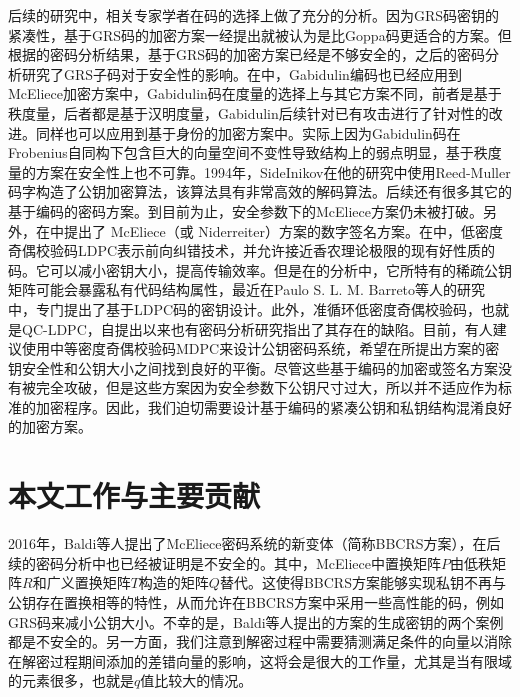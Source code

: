 后续的研究中，相关专家学者在码的选择上做了充分的分析。因为GRS码密钥的紧凑性，基于GRS码的加密方案一经提出就被认为是比Goppa码更适合的方案。但根据\cite{Couvreur2013Distinguisher}的密码分析结果，基于GRS码的加密方案已经是不够安全的，之后的密码分析研究了GRS子码对于安全性的影响\cite{Wieschebrink2010Cryptanalysis}。在\cite{Loidreau2017A}中，Gabidulin编码也已经应用到McEliece加密方案中，Gabidulin码在度量的选择上与其它方案不同，前者是基于秩度量，后者都是基于汉明度量，Gabidulin后续针对已有攻击进行了针对性的改进\cite{Gabidulin2003Reducible, Gabidulin2001Modified, Berger2004Designing, Ding2014On}。同样也可以应用到基于身份的加密方案中\cite{Gaborit2017Identity}。实际上因为Gabidulin码在Frobenius自同构下包含巨大的向量空间不变性导致结构上的弱点明显\cite{Gibson1995Severely, Gibson1996The, Overbeck2008Structural}，基于秩度量的方案在安全性上也不可靠。1994年，SideInikov在他的研究中使用Reed-Muller码字构造了公钥加密算法\cite{Sidel1994Open}，该算法具有非常高效的解码算法。后续还有很多其它的基于编码的密码方案。到目前为止，安全参数下的McEliece方案仍未被打破。另外，在\cite{Courtois2001How}中提出了 McEliece（或 Niderreiter）方案的数字签名方案。在\cite{Baldi2007Cryptanalysis}中，低密度奇偶校验码LDPC表示前向纠错技术，并允许接近香农理论极限的现有好性质的码。它可以减小密钥大小，提高传输效率。但是在\cite{Baldi2008A}的分析中，它所特有的稀疏公钥矩阵可能会暴露私有代码结构属性，最近在Paulo S. L. M. Barreto等人的研究中\cite{Barreto2017CAKE}，专门提出了基于LDPC码的密钥设计。此外，准循环低密度奇偶校验码，也就是QC-LDPC\cite{Baldi2013Optimization}，自提出以来也有密码分析研究\cite{Otmani2010Cryptanalysis}指出了其存在的缺陷。目前，有人建议使用中等密度奇偶校验码MDPC来设计公钥密码系统\cite{Misoczki2013MDPC, Heyse2013Smaller}，希望在所提出方案的密钥安全性和公钥大小之间找到良好的平衡。尽管这些基于编码的加密或签名方案没有被完全攻破，但是这些方案因为安全参数下公钥尺寸过大，所以并不适应作为标准的加密程序。因此，我们迫切需要设计基于编码的紧凑公钥和私钥结构混淆良好的加密方案。

\section{本文工作与主要贡献}
2016年，Baldi等人提出了McEliece密码系统的新变体（简称BBCRS方案），在后续的密码分析中也已经被证明是不安全的。其中，McEliece中置换矩阵$P$由低秩矩阵$R$和广义置换矩阵$T$构造的矩阵$Q$替代。这使得BBCRS方案能够实现私钥不再与公钥存在置换相等的特性，从而允许在BBCRS方案中采用一些高性能的码，例如GRS码来减小公钥大小。不幸的是，Baldi等人提出的方案的生成密钥的两个案例都是不安全的。另一方面，我们注意到解密过程中需要猜测满足条件的向量以消除在解密过程期间添加的差错向量的影响，这将会是很大的工作量，尤其是当有限域的元素很多，也就是$q$值比较大的情况。

